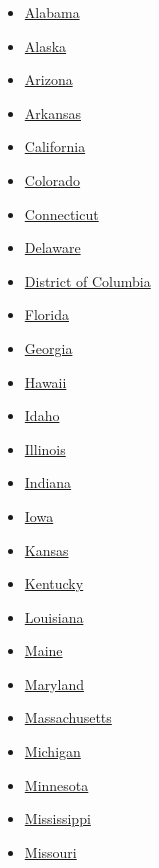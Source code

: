 \begin{itemize}
\tightlist
\item
  \href{//www.nytimes.com/elections/2016/results/alabama}{Alabama}
\item
  \href{//www.nytimes.com/elections/2016/results/alaska}{Alaska}
\item
  \href{//www.nytimes.com/elections/2016/results/arizona}{Arizona}
\item
  \href{//www.nytimes.com/elections/2016/results/arkansas}{Arkansas}
\item
  \href{//www.nytimes.com/elections/2016/results/california}{California}
\item
  \href{//www.nytimes.com/elections/2016/results/colorado}{Colorado}
\item
  \href{//www.nytimes.com/elections/2016/results/connecticut}{Connecticut}
\item
  \href{//www.nytimes.com/elections/2016/results/delaware}{Delaware}
\item
  \href{//www.nytimes.com/elections/2016/results/district-of-columbia}{District
  of Columbia}
\item
  \href{//www.nytimes.com/elections/2016/results/florida}{Florida}
\item
  \href{//www.nytimes.com/elections/2016/results/georgia}{Georgia}
\item
  \href{//www.nytimes.com/elections/2016/results/hawaii}{Hawaii}
\item
  \href{//www.nytimes.com/elections/2016/results/idaho}{Idaho}
\end{itemize}

\begin{itemize}
\tightlist
\item
  \href{//www.nytimes.com/elections/2016/results/illinois}{Illinois}
\item
  \href{//www.nytimes.com/elections/2016/results/indiana}{Indiana}
\item
  \href{//www.nytimes.com/elections/2016/results/iowa}{Iowa}
\item
  \href{//www.nytimes.com/elections/2016/results/kansas}{Kansas}
\item
  \href{//www.nytimes.com/elections/2016/results/kentucky}{Kentucky}
\item
  \href{//www.nytimes.com/elections/2016/results/louisiana}{Louisiana}
\item
  \href{//www.nytimes.com/elections/2016/results/maine}{Maine}
\item
  \href{//www.nytimes.com/elections/2016/results/maryland}{Maryland}
\item
  \href{//www.nytimes.com/elections/2016/results/massachusetts}{Massachusetts}
\item
  \href{//www.nytimes.com/elections/2016/results/michigan}{Michigan}
\item
  \href{//www.nytimes.com/elections/2016/results/minnesota}{Minnesota}
\item
  \href{//www.nytimes.com/elections/2016/results/mississippi}{Mississippi}
\item
  \href{//www.nytimes.com/elections/2016/results/missouri}{Missouri}
\end{itemize}

